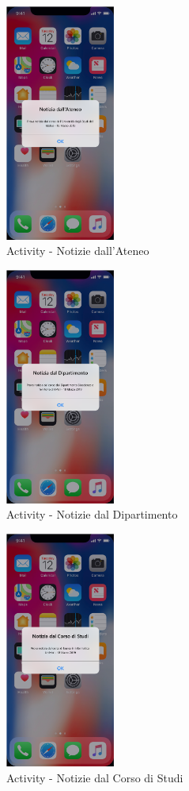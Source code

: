 \begin{figure}
	\centering
	\includegraphics[width=0.32\textwidth]{imgs/gruppo2/activity-notifiche-notizie-ateneo}
	\caption{Activity - Notizie dall'Ateneo}
	\label{fig:activity-notifiche-notizie-ateneo}
\end{figure}

\begin{figure}
	\centering
	\includegraphics[width=0.32\textwidth]{imgs/gruppo2/activity-notifiche-notizie-dipartimento}
	\caption{Activity - Notizie dal Dipartimento}
	\label{fig:activity-notifiche-notizie-dipartimento}
\end{figure}

\begin{figure}
	\centering
	\includegraphics[width=0.32\textwidth]{imgs/gruppo2/activity-notifiche-notizie-corso-di-studi}
	\caption{Activity - Notizie dal Corso di Studi}
	\label{fig:activity-notifiche-notizie-corso-di-studi}
\end{figure}

\clearpage